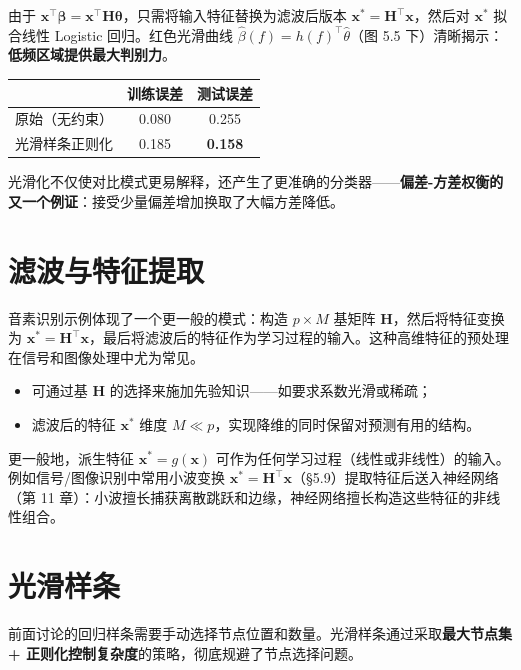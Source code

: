 由于 $\mathbf{x}^\top\boldsymbol{\beta} = \mathbf{x}^\top\mathbf{H}\boldsymbol{\theta}$，只需将输入特征替换为滤波后版本 $\mathbf{x}^* = \mathbf{H}^\top\mathbf{x}$，然后对 $\mathbf{x}^*$ 拟合线性 Logistic 回归。红色光滑曲线 $\hat{\beta}(f) = h(f)^\top\hat{\theta}$（图 5.5 下）清晰揭示：\textbf{低频区域提供最大判别力}。

\begin{center}
\begin{tabular}{lcc}
\toprule
& 训练误差 & 测试误差 \\
\midrule
原始（无约束） & 0.080 & 0.255 \\
光滑样条正则化 & 0.185 & \textbf{0.158} \\
\bottomrule
\end{tabular}
\end{center}

光滑化不仅使对比模式更易解释，还产生了更准确的分类器——\textbf{偏差-方差权衡的又一个例证}：接受少量偏差增加换取了大幅方差降低。


\section{滤波与特征提取}

音素识别示例体现了一个更一般的模式：构造 $p \times M$ 基矩阵 $\mathbf{H}$，然后将特征变换为 $\mathbf{x}^* = \mathbf{H}^\top\mathbf{x}$，最后将滤波后的特征作为学习过程的输入。这种高维特征的预处理在信号和图像处理中尤为常见。

\begin{itemize}
    \item 可通过基 $\mathbf{H}$ 的选择来施加先验知识——如要求系数光滑或稀疏；
    \item 滤波后的特征 $\mathbf{x}^*$ 维度 $M \ll p$，实现降维的同时保留对预测有用的结构。
\end{itemize}

更一般地，派生特征 $\mathbf{x}^* = g(\mathbf{x})$ 可作为任何学习过程（线性或非线性）的输入。例如信号/图像识别中常用小波变换 $\mathbf{x}^* = \mathbf{H}^\top\mathbf{x}$（§5.9）提取特征后送入神经网络（第 11 章）：小波擅长捕获离散跳跃和边缘，神经网络擅长构造这些特征的非线性组合。


\section{光滑样条}

前面讨论的回归样条需要手动选择节点位置和数量。光滑样条通过采取\textbf{最大节点集 + 正则化控制复杂度}的策略，彻底规避了节点选择问题。


